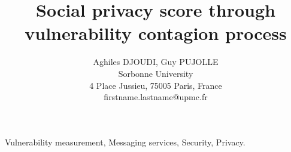 \documentclass[conference]{../../setup/IEEEtran}
\title{Social privacy score through vulnerability contagion process}
\author{
	Aghiles DJOUDI, Guy PUJOLLE \\ \textsf{Sorbonne University} \\ \textsf{4 Place Jussieu, 75005 Paris, France} \\ \textsf{firstname.lastname@upmc.fr}
}
\begin{document}
\maketitle



\begin{IEEEkeywords}
	Vulnerability measurement,
	Messaging services,
	Security,
	Privacy.
\end{IEEEkeywords}






%


\printbibliography
\end{document}
